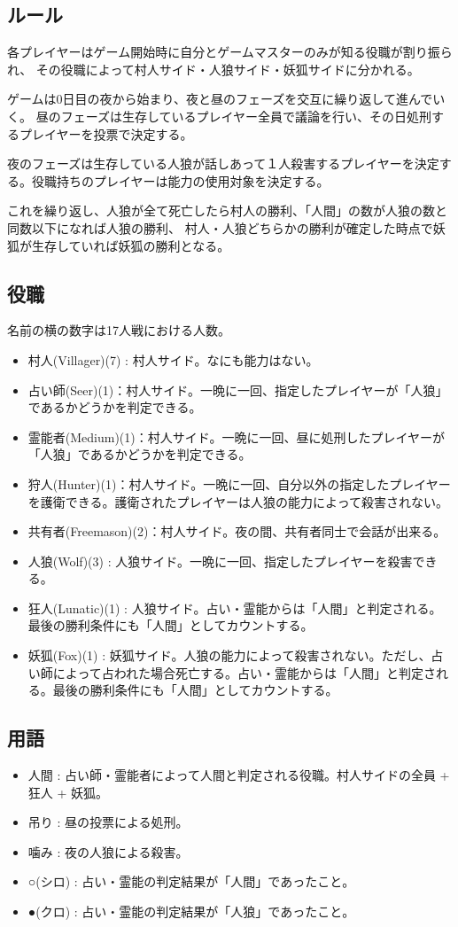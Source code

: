 ﻿\documentclass[a4paper,twocolumn]{jsarticle}
\begin{document}
\subsection{ルール}

各プレイヤーはゲーム開始時に自分とゲームマスターのみが知る役職が割り振られ、
その役職によって村人サイド・人狼サイド・妖狐サイドに分かれる。

ゲームは0日目の夜から始まり、夜と昼のフェーズを交互に繰り返して進んでいく。
昼のフェーズは生存しているプレイヤー全員で議論を行い、その日処刑するプレイヤーを投票で決定する。

夜のフェーズは生存している人狼が話しあって１人殺害するプレイヤーを決定する。役職持ちのプレイヤーは能力の使用対象を決定する。

これを繰り返し、人狼が全て死亡したら村人の勝利、「人間」の数が人狼の数と同数以下になれば人狼の勝利、
村人・人狼どちらかの勝利が確定した時点で妖狐が生存していれば妖狐の勝利となる。

\subsection{役職}
名前の横の数字は17人戦における人数。
\begin{itemize}
\item 村人(Villager)(7) : 村人サイド。なにも能力はない。
\item 占い師(Seer)(1)：村人サイド。一晩に一回、指定したプレイヤーが「人狼」であるかどうかを判定できる。
\item 霊能者(Medium)(1)：村人サイド。一晩に一回、昼に処刑したプレイヤーが「人狼」であるかどうかを判定できる。
\item 狩人(Hunter)(1)：村人サイド。一晩に一回、自分以外の指定したプレイヤーを護衛できる。護衛されたプレイヤーは人狼の能力によって殺害されない。
\item 共有者(Freemason)(2)：村人サイド。夜の間、共有者同士で会話が出来る。
\item 人狼(Wolf)(3) : 人狼サイド。一晩に一回、指定したプレイヤーを殺害できる。
\item 狂人(Lunatic)(1) : 人狼サイド。占い・霊能からは「人間」と判定される。最後の勝利条件にも「人間」としてカウントする。
\item 妖狐(Fox)(1) : 妖狐サイド。人狼の能力によって殺害されない。ただし、占い師によって占われた場合死亡する。占い・霊能からは「人間」と判定される。最後の勝利条件にも「人間」としてカウントする。
\end{itemize}

\subsection{用語}
\begin{itemize}
\item 人間 : 占い師・霊能者によって人間と判定される役職。村人サイドの全員 + 狂人 + 妖狐。
\item 吊り : 昼の投票による処刑。
\item 噛み : 夜の人狼による殺害。
\item ○(シロ) : 占い・霊能の判定結果が「人間」であったこと。 
\item ●(クロ) : 占い・霊能の判定結果が「人狼」であったこと。 
\end{itemize}
\end{document}
